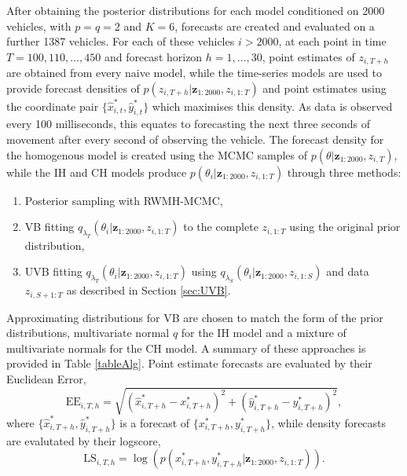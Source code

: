 \documentclass[12pt,a4paper]{article}\usepackage[]{graphicx}\usepackage[]{color}
\begin{document}
After obtaining the posterior distributions for each model conditioned on 2000 vehicles, with $p = q = 2$ and $K = 6$, forecasts are created and evaluated on a further 1387 vehicles. For each of these vehicles $i > 2000$, at each point in time $T = 100, 110, \dots, 450$ and forecast horizon $h = 1, \dots, 30$, point estimates of $z_{i, T+h}$ are obtained from every naive model, while the time-series models are used to provide forecast densities of $p(z_{i, T+h} | \textbf{z}_{1:2000}, z_{i, 1:T})$ and point estimates using the coordinate pair $\{\hat{x}_{i, t}^*, \hat{y}_{i, t}^*\}$ which maximises this density. As data is observed every 100 milliseconds, this equates to forecasting the next three seconds of movement after every second of observing the vehicle. The forecast density for the homogenous model is created using the MCMC samples of $p(\theta | \textbf{z}_{1:2000}, z_{i, T})$, while the IH and CH models produce $p(\theta_{i} | \textbf{z}_{1:2000}, z_{i, 1:T})$ through three methods:
\begin{enumerate}
\item Posterior sampling with RWMH-MCMC,
\item VB fitting $q_{\lambda_T}(\theta_{i} | \textbf{z}_{1:2000}, z_{i, 1:T})$ to the complete $z_{i, 1:T}$ using the original prior distribution,
\item UVB fitting $q_{\lambda_T}(\theta_{i} | \textbf{z}_{1:2000}, z_{i, 1:T})$ using $q_{\lambda_S}(\theta_{i} | \textbf{z}_{1:2000}, z_{i, 1:S})$ and data $z_{i, S+1:T}$ as described in Section \ref{sec:UVB}.
\end{enumerate}
Approximating distributions for VB are chosen to match the form of the prior distributions, multivariate normal $q$ for the IH model and a mixture of multivariate normals for the CH model. A summary of these approaches is provided in Table \ref{tableAlg}. Point estimate forecasts are evaluated by their Euclidean Error,
\begin{equation}
\mbox{EE}_{i, T, h} = \sqrt{\left(\hat{x}^*_{i, T+h} - x^*_{i, T+h} \right)^2 + \left(\hat{y}^*_{i, T+h} - y^*_{i, T+h} \right)^2},
\label{eucError}
\end{equation}
where $\{\hat{x}^*_{i, T+h}, \hat{y}^*_{i, T+h}\}$ is a forecast of $\{x^*_{i, T+h}, y^*_{i, T+h}\}$, while density forecasts are evalutated by their logscore,
\begin{equation}
\mbox{LS}_{i, T, h} = \log \left(p\left(x^*_{i, T+h}, y^*_{i, T+h} | \textbf{z}_{1:2000}, z_{i, 1:T} \right) \right).
\label{logscore}
\end{equation}
\end{document}
